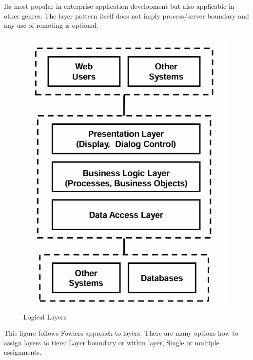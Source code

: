 \documentclass[../Main.tex]{subfiles}
\begin{document}
Its most popular in enterprise application development but also applicable in other genres.
The layer pattern itself does not imply process/server boundary and any use of remoting is optional.


\begin{figure}[H]
    \centering
    \includegraphics[width=0.4\linewidth]{Images/logicallayer.png}
    \caption{Logical Layers}
\end{figure}

This figure follows Fowlers approach to layers.
There are many options how to assign layers to tiers: Layer boundary or
within layer,  Single or multiple assignments.

\newpage
\end{document}
